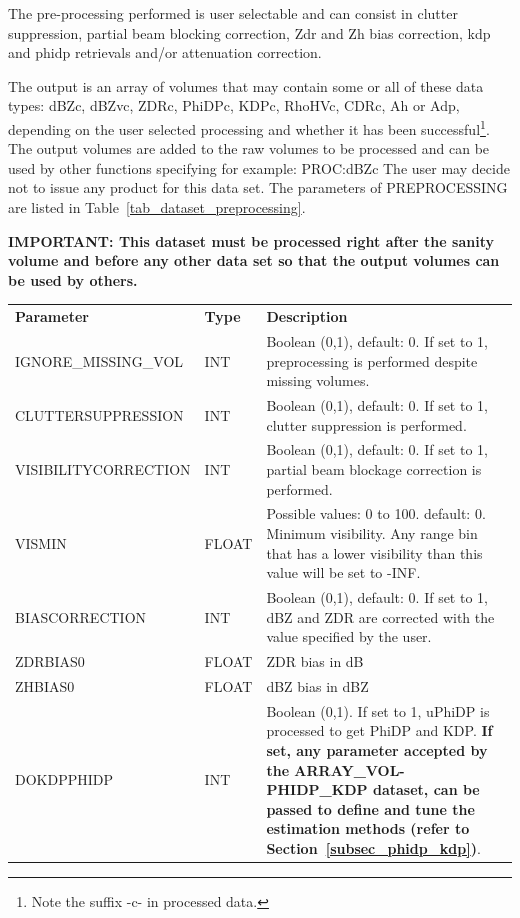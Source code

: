 \documentclass[a4paper,11pt,pdftex,twoside]{scrartcl}
\renewcommand{\bf}{\normalfont \bfseries}
\begin{document}
{{{The pre-processing performed is user selectable and can consist in clutter suppression,  partial beam blocking correction, Zdr and Zh bias correction,  kdp and phidp retrievals and/or attenuation correction.


The output is an array of volumes that may contain some or all of these data types: dBZc, dBZvc, ZDRc, PhiDPc, KDPc, RhoHVc, CDRc, Ah or Adp, depending on the user selected processing and whether it has been successful\footnote{Note the suffix -c- in processed data.}.
The output volumes are added to the raw volumes to be processed and can be used by other functions specifying for example: PROC:dBZc
The user may decide not to issue any product for this data set. The parameters of PREPROCESSING are listed in Table~\ref{tab_dataset_preprocessing}.


\textbf{IMPORTANT: This dataset must be processed right after the sanity volume and before any other data set so that the output volumes can be used by others.}


\begin{table}[H]
\begin{tabularx}{\textwidth}{llX}
\bf{Parameter}  & \bf{Type}  & \bf{Description}\\
IGNORE\_MISSING\_VOL         & INT     & Boolean (0,1), default: 0. If set to 1, preprocessing is performed despite missing volumes.\\

CLUTTERSUPPRESSION & INT & Boolean (0,1), default: 0. If set to 1, clutter suppression is performed.\\

VISIBILITYCORRECTION & INT & Boolean (0,1), default: 0. If set to 1, partial beam blockage correction is performed.\\

VISMIN & FLOAT & Possible values: 0 to 100. default: 0. Minimum visibility. Any range bin that has a lower visibility than this value will be set to -INF.\\

BIASCORRECTION & INT & Boolean (0,1), default: 0. If set to 1, dBZ and ZDR are corrected with the value specified by the user.\\

ZDRBIAS0 & FLOAT & ZDR bias in dB\\

ZHBIAS0 & FLOAT & dBZ bias in dBZ\\

DOKDPPHIDP & INT & Boolean (0,1). If set to 1, uPhiDP is processed to get PhiDP and KDP. \textbf{If set, any parameter accepted by the ARRAY\_VOL-PHIDP\_KDP dataset, can be passed to define and tune the estimation methods (refer to Section~\ref{subsec_phidp_kdp})}.\\


\end{tabularx}
\end{table}}}}
\end{document}
